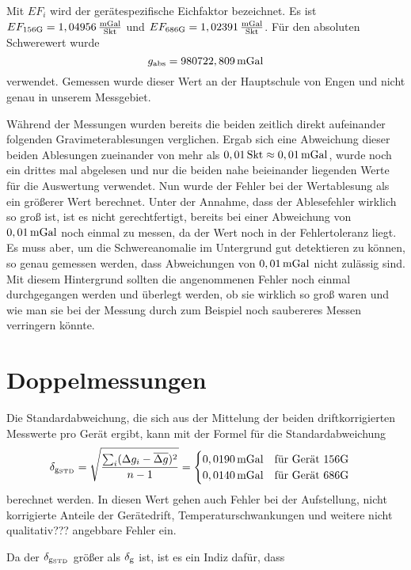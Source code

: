 Mit $EF_i$ wird der gerätespezifische Eichfaktor bezeichnet. Es ist $EF_{\mathrm{156G}}=1,04956\,\frac{\mathrm{mGal}}{\mathrm{Skt}}$ und $EF_{\mathrm{686G}}=1,02391\,\frac{\mathrm{mGal}}{\mathrm{Skt}}$. Für den absoluten Schwerewert wurde
\begin{equation}
 g_{\mathrm{abs}}=980722,809\,\mathrm{mGal}
\end{equation}
verwendet. Gemessen wurde dieser Wert an der Hauptschule von Engen und nicht genau in unserem Messgebiet.

Während der Messungen wurden bereits die beiden zeitlich direkt aufeinander folgenden Gravimeterablesungen verglichen. Ergab sich eine Abweichung dieser beiden Ablesungen zueinander von mehr als $0,01\,\mathrm{Skt}\approx0,01\,\mathrm{mGal}$, wurde noch ein drittes mal abgelesen und nur die beiden nahe beieinander liegenden Werte für die Auswertung verwendet. Nun wurde der Fehler bei der Wertablesung als ein größerer Wert berechnet. Unter der Annahme, dass der Ablesefehler wirklich so groß ist, ist es nicht gerechtfertigt, bereits bei einer Abweichung von $0,01\,\mathrm{mGal}$ noch einmal zu messen, da der Wert noch in der Fehlertoleranz liegt. Es muss aber, um die Schwereanomalie im Untergrund gut detektieren zu können, so genau gemessen werden, dass Abweichungen von $0,01\,\mathrm{mGal}$ nicht zulässig sind. Mit diesem Hintergrund sollten die angenommenen Fehler noch einmal durchgegangen werden und überlegt werden, ob sie wirklich so groß waren und wie man sie bei der Messung durch zum Beispiel noch saubereres Messen verringern könnte.

\section{Doppelmessungen}
\label{sec:Fehler}

Die Standardabweichung, die sich aus der Mittelung der beiden driftkorrigierten Messwerte pro Gerät ergibt, kann mit der Formel für die Standardabweichung
\begin{equation}
 \delta_{\mathrm{g_{\mathrm{STD}}}}=\sqrt{\frac{\sum_i (\Delta g_i - \overline{\Delta g})^2}{n-1}}
 =\begin{cases}
   0,0190\,\mathrm{mGal} \quad \text{für Gerät 156G}\\
     0,0140\,\mathrm{mGal} \quad \text{für Gerät 686G}
  \end{cases}
  \label{eq:Fehler}
\end{equation}
berechnet werden. In diesen Wert gehen auch Fehler bei der Aufstellung, nicht korrigierte Anteile der Gerätedrift, Temperaturschwankungen und weitere nicht qualitativ??? angebbare Fehler ein.

Da der $\delta_{\mathrm{g_{\mathrm{STD}}}}$ größer als $\delta_{\mathrm{g}}$ ist, ist es ein Indiz dafür, dass 